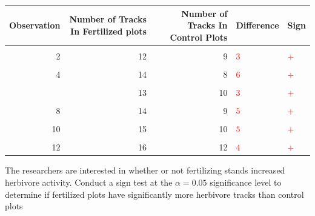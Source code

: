 \documentclass[
]{article}
\begin{document}
\begin{table}[H]
\centering\centering
\begin{tabular}{rrrll}
\toprule
Observation & Number of Tracks In Fertilized plots & Number of Tracks In Control Plots & Difference & Sign\\
\midrule
\cellcolor{gray!10}{1} & \cellcolor{gray!10}{15} & \cellcolor{gray!10}{10} & \cellcolor{gray!10}{\textcolor{red}{$5$}} & \cellcolor{gray!10}{\textcolor{red}{$+$}}\\
2 & 12 & 9 & \textcolor{red}{$3$} & \textcolor{red}{$+$}\\
\cellcolor{gray!10}{3} & \cellcolor{gray!10}{18} & \cellcolor{gray!10}{11} & \cellcolor{gray!10}{\textcolor{red}{$7$}} & \cellcolor{gray!10}{\textcolor{red}{$+$}}\\
4 & 14 & 8 & \textcolor{red}{$6$} & \textcolor{red}{$+$}\\
\cellcolor{gray!10}{5} & \cellcolor{gray!10}{16} & \cellcolor{gray!10}{12} & \cellcolor{gray!10}{\textcolor{red}{$4$}} & \cellcolor{gray!10}{\textcolor{red}{$+$}}\\
\addlinespace
6 & 13 & 10 & \textcolor{red}{$3$} & \textcolor{red}{$+$}\\
\cellcolor{gray!10}{7} & \cellcolor{gray!10}{17} & \cellcolor{gray!10}{11} & \cellcolor{gray!10}{\textcolor{red}{$6$}} & \cellcolor{gray!10}{\textcolor{red}{$+$}}\\
8 & 14 & 9 & \textcolor{red}{$5$} & \textcolor{red}{$+$}\\
\cellcolor{gray!10}{9} & \cellcolor{gray!10}{19} & \cellcolor{gray!10}{13} & \cellcolor{gray!10}{\textcolor{red}{$6$}} & \cellcolor{gray!10}{\textcolor{red}{$+$}}\\
10 & 15 & 10 & \textcolor{red}{$5$} & \textcolor{red}{$+$}\\
\addlinespace
\cellcolor{gray!10}{11} & \cellcolor{gray!10}{11} & \cellcolor{gray!10}{8} & \cellcolor{gray!10}{\textcolor{red}{$3$}} & \cellcolor{gray!10}{\textcolor{red}{$+$}}\\
12 & 16 & 12 & \textcolor{red}{$4$} & \textcolor{red}{$+$}\\
\bottomrule
\end{tabular}
\end{table}

The researchers are interested in whether or not fertilizing stands
increased herbivore activity. Conduct a sign test at the
\(\alpha = 0.05\) significance level to determine if fertilized plots
have significantly more herbivore tracks than control plots
\end{document}
